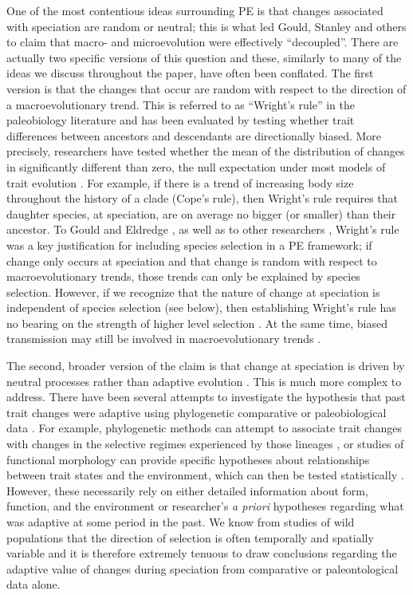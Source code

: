 One of the most contentious ideas surrounding PE is that changes associated with speciation are random or neutral; this is what led Gould, Stanley and others to claim that macro- and microevolution were effectively ``decoupled''. There are actually two specific versions of this question and these, similarly to many of the ideas we discuss throughout the paper, have often been conflated. The first version is that the changes that occur are random with respect to the direction of a macroevolutionary trend. This is referred to as ``Wright's rule'' in the paleobiology literature \citep{GouldEldredge1977} and has been evaluated by testing whether trait differences between ancestors and descendants are directionally biased. More precisely, researchers have tested whether the mean of the distribution of changes in significantly different than zero, the null expectation under most models of trait evolution \citep{Wagner1996, Wagner2001}. For example, if there is a trend of increasing body size throughout the history of a clade (Cope's rule), then Wright's rule requires that daughter species, at speciation, are on average no bigger (or smaller) than their ancestor. To Gould and Eldredge \citeyearpar{GouldEldredge1977}, as well as to other researchers \citep[for example,][]{Stanley1975, Stanley1979}, Wright's rule was a key justification for including species selection in a PE framework; if change only occurs at speciation and that change is random with respect to macroevolutionary trends, those trends can only be explained by species selection. However, if we recognize that the nature of change at speciation is independent of species selection (see below), then establishing Wright's rule has no bearing on the strength of higher level selection \citep{Simpson2013}. At the same time, biased transmission may still be involved in macroevolutionary trends \citep{McShea1994, McShea1998,Wagner1996}.

The second, broader version of the claim is that change at speciation is driven by neutral processes rather than adaptive evolution \citep{Stanley1979, Gould1980, Gould2002}. This is much more complex to address. There have been several attempts to investigate the hypothesis that past trait changes were adaptive using phylogenetic comparative or paleobiological data  \citep[see for example,][]{Adaptation}. For example, phylogenetic methods can attempt to associate trait changes with changes in the selective regimes experienced by those lineages \citep{Baum1991, ButlerKing2004, Beaulieu2012}, or studies of functional morphology can provide specific hypotheses about relationships between trait states and the environment, which can then be tested statistically \citep{Wainwright2007}. However, these necessarily rely on either detailed information about form, function, and the environment \citep[e.g.,][and references therein]{Vermeij1987} or researcher's \emph{a priori} hypotheses regarding what was adaptive at some period in the past. We know from studies of wild populations that the direction of selection is often temporally and spatially variable \citep{Grant2002, Siepielski2009, Siepielski2011} and it is therefore extremely tenuous to draw conclusions regarding the adaptive value of changes during speciation from comparative or paleontological data alone.


